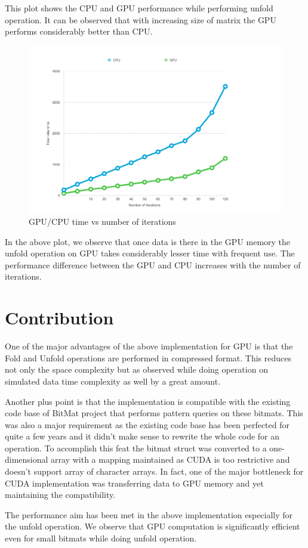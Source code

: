 \documentclass{article}
\begin{document}
This plot shows the CPU and GPU performance while performing unfold operation. It can be observed that with increasing size of matrix the GPU performs considerably better than CPU.
\pagebreak
\begin{figure}[ht]
        \includegraphics[width=.75\textwidth]{iter_plot.png}
        \caption{GPU/CPU time vs number of iterations}
        \centering
\end{figure}

In the above plot, we observe that once data is there in the GPU memory the unfold operation on GPU takes considerably lesser time with frequent use. The performance difference between the GPU and CPU increases with the number of iterations.

\section*{Contribution}
One of the major advantages of the above implementation for GPU is that the Fold and Unfold operations are performed in compressed format. This reduces not only the space complexity but as observed while doing operation on simulated data time complexity as well by a great amount.

Another plus point is that the implementation is compatible with the existing code base of BitMat project that performs pattern queries on these bitmats. This was also a major requirement as the existing code base has been perfected for quite a few years and it didn't make sense to rewrite the whole code for an operation. To accomplish this feat the bitmat struct was converted to a one-dimensional array with a mapping maintained as CUDA is too restrictive and doesn't support array of character arrays. In fact, one of the major bottleneck for CUDA implementation was transferring data to GPU memory and yet maintaining the compatibility.

The performance aim has been met in the above implementation especially for the unfold operation. We observe that GPU computation is significantly efficient even for small bitmats while doing unfold operation.
\end{document}
